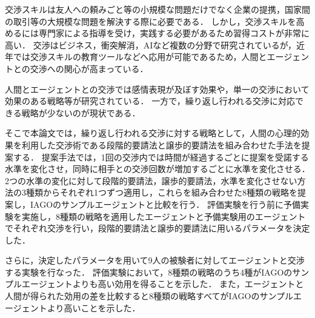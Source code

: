 
交渉スキルは友人への頼みごと等の小規模な問題だけでなく企業の提携，国家間の取引等の大規模な問題を解決する際に必要である．
しかし，交渉スキルを高めるには専門家による指導を受け，実践する必要があるため習得コストが非常に高い．
交渉はビジネス，衝突解消，AIなど複数の分野で研究されているが，近年では交渉スキルの教育ツールなどへ応用が可能であるため，人間とエージェントとの交渉への関心が高まっている．

人間とエージェントとの交渉では感情表現が及ぼす効果や，単一の交渉において効果のある戦略等が研究されている．
一方で，繰り返し行われる交渉に対応できる戦略が少ないのが現状である．

そこで本論文では，繰り返し行われる交渉に対する戦略として，人間の心理的効果を利用した交渉術である段階的要請法と譲歩的要請法を組み合わせた手法を提案する．
提案手法では，1回の交渉内では時間が経過するごとに提案を受諾する水準を変化させ，同時に相手との交渉回数が増加するごとに水準を変化させる．
2つの水準の変化に対して段階的要請法，譲歩的要請法，水準を変化させない方法の3種類からそれぞれ1つずつ適用し，これらを組み合わせた8種類の戦略を提案し，IAGOのサンプルエージェントと比較を行う．
評価実験を行う前に予備実験を実施し，8種類の戦略を適用したエージェントと予備実験用のエージェントでそれぞれ交渉を行い，段階的要請法と譲歩的要請法に用いるパラメータを決定した．

さらに，決定したパラメータを用いて9人の被験者に対してエージェントと交渉する実験を行なった．
評価実験において，8種類の戦略のうち4種がIAGOのサンプルエージェントよりも高い効用を得ることを示した．
また，エージェントと人間が得られた効用の差を比較すると8種類の戦略すべてがIAGOのサンプルエージェントより高いことを示した．
